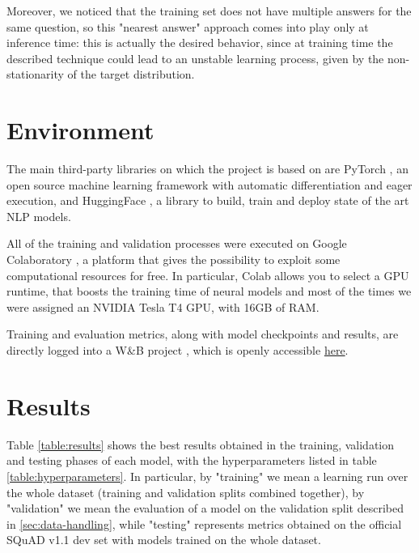 \documentclass[a4paper,10pt]{report}
\begin{document}
Moreover, we noticed that the training set does not have multiple answers for the same question, so this "nearest answer" approach comes into play only at inference time: this is actually the desired behavior, since at training time the described technique could lead to an unstable learning process, given by the non-stationarity of the target distribution.

\section{Environment}
The main third-party libraries on which the project is based on are PyTorch \cite{pytorch}, an open source machine learning framework with automatic differentiation and eager execution, and HuggingFace \cite{hugginface}, a library to build, train and deploy state of the art NLP models.

All of the training and validation processes were executed on Google Colaboratory \cite{colab}, a platform that gives the possibility to exploit some computational resources for free. In particular, Colab allows you to select a GPU runtime, that boosts the training time of neural models and most of the times we were assigned an NVIDIA Tesla T4 GPU, with 16GB of RAM. 

Training and evaluation metrics, along with model checkpoints and results, are directly logged into a W\&B project \cite{wandb}, which is openly accessible \href{https://wandb.ai/wadaboa/squad-qa}{here}.

\section{Results}
Table \ref{table:results} shows the best results obtained in the training, validation and testing phases of each model, with the hyperparameters listed in table \ref{table:hyperparameters}. In particular, by "training" we mean a learning run over the whole dataset (training and validation splits combined together), by "validation" we mean the evaluation of a model on the validation split described in \ref{sec:data-handling}, while "testing" represents metrics obtained on the official SQuAD v1.1 dev set with models trained on the whole dataset. 
\end{document}
